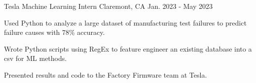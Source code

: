   \begin{cventry}
    {Tesla} %
    {Machine Learning Intern} %
    {Claremont, CA} %
    {Jan. 2023 - May 2023} %
    {
      \begin{cvitems} %
        \item {
        Used Python to analyze a large dataset of manufacturing test failures to predict failure causes with 78\% accuracy.
        }
        \item{
        Wrote Python scripts using RegEx to feature engineer an existing database into a csv for ML methods.
        }
        \item {
        Presented results and code to the Factory Firmware team at Tesla.
        }
      \end{cvitems}
    }
  \end{cventry}
